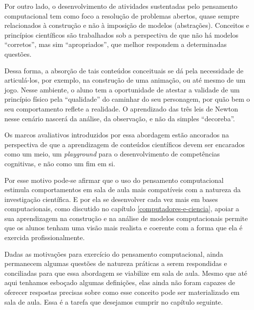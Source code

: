 Por outro lado, o desenvolvimento de atividades sustentadas pelo pensamento computacional tem como foco a resolução de problemas abertos, quase sempre relacionados à construção e não à imposição de modelos (abstrações). Conceitos e princípios científicos são trabalhados sob a perspectiva de que não há modelos ``corretos'', mas sim ``apropriados'', que melhor respondem a determinadas questões. 

Dessa forma, a absorção de tais conteúdos conceituais se dá pela necessidade de articulá-los, por exemplo, na construção de uma animação, ou até mesmo de um jogo. Nesse ambiente, o aluno tem a oportunidade de atestar a validade de um princípio físico pela ``qualidade'' do caminhar do seu personagem, por quão bem o seu comportamento reflete a realidade. O aprendizado das três leis de Newton nesse cenário nascerá da análise, da observação, e não da simples ``decoreba''. 

Os marcos avaliativos introduzidos por essa abordagem estão ancorados na perspectiva de que a aprendizagem de conteúdos científicos devem ser encarados como um meio, um \textit{playground} para o desenvolvimento de competências cognitivas, e não como um fim em si. 

Por esse motivo pode-se afirmar que o uso do pensamento computacional estimula comportamentos em sala de aula mais compatíveis com a natureza da investigação científica. E por ela se desenvolver cada vez mais em bases computacionais, como discutido no capítulo \ref{computadores-e-ciencia}, apoiar a sua aprendizagem na construção e na análise de modelos computacionais permite que os alunos tenham uma visão mais realista e coerente com a forma que ela é exercida profissionalmente. 

Dadas as motivações para exercício do pensamento computacional, ainda permanecem algumas questões de natureza práticas a serem respondidas e conciliadas para que essa abordagem se viabilize em sala de aula. Mesmo que até aqui tenhamos esboçado algumas definições, elas ainda não foram capazes de oferecer respostas precisas sobre como esse conceito pode ser materializado em sala de aula. Essa é a tarefa que desejamos cumprir no capítulo seguinte.






